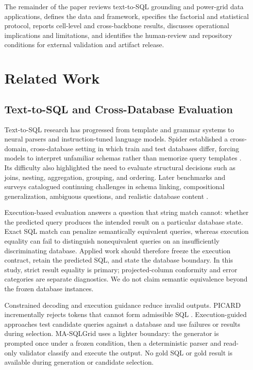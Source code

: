 \documentclass[applsci,article,submit,moreauthors]{Definitions/mdpi}
\newcommand{\masql}{MA-SQLGrid}
\begin{document}
The remainder of the paper reviews text-to-SQL grounding and power-grid data applications, defines the data and framework, specifies the factorial and statistical protocol, reports cell-level and cross-backbone results, discusses operational implications and limitations, and identifies the human-review and repository conditions for external validation and artifact release.

\section{Related Work}
\subsection{Text-to-SQL and Cross-Database Evaluation}
Text-to-SQL research has progressed from template and grammar systems to neural parsers and instruction-tuned language models. Spider established a cross-domain, cross-database setting in which train and test databases differ, forcing models to interpret unfamiliar schemas rather than memorize query templates \cite{yu2018spider}. Its difficulty also highlighted the need to evaluate structural decisions such as joins, nesting, aggregation, grouping, and ordering. Later benchmarks and surveys catalogued continuing challenges in schema linking, compositional generalization, ambiguous questions, and realistic database content \cite{katsogiannis2023survey,lee2021kaggledbqa,li2023bird}.

Execution-based evaluation answers a question that string match cannot: whether the predicted query produces the intended result on a particular database state. Exact SQL match can penalize semantically equivalent queries, whereas execution equality can fail to distinguish nonequivalent queries on an insufficiently discriminating database. Applied work should therefore freeze the execution contract, retain the predicted SQL, and state the database boundary. In this study, strict result equality is primary; projected-column conformity and error categories are separate diagnostics. We do not claim semantic equivalence beyond the frozen database instances.

Constrained decoding and execution guidance reduce invalid outputs. PICARD incrementally rejects tokens that cannot form admissible SQL \cite{scholak2021picard}. Execution-guided approaches test candidate queries against a database and use failures or results during selection. \masql{} uses a lighter boundary: the generator is prompted once under a frozen condition, then a deterministic parser and read-only validator classify and execute the output. No gold SQL or gold result is available during generation or candidate selection.
\end{document}
